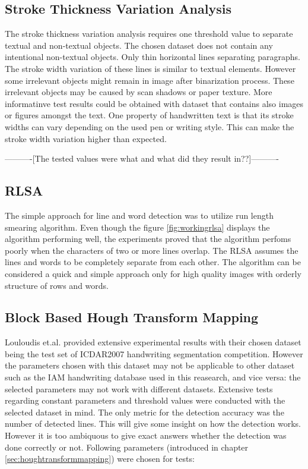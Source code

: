 \documentclass{article}
\begin{document}
    \subsection{Stroke Thickness Variation Analysis}
      The stroke thickness variation analysis requires one threshold value to separate textual and non-textual objects. The chosen dataset does not contain any intentional non-textual objects. Only thin horizontal lines separating paragraphs. The stroke width variation of these lines is similar to textual elements. However some irrelevant objects might remain in image after binarization process. These irrelevant objects may be caused by scan shadows or paper texture. More informatinve test results could be obtained with dataset that contains also images or figures amongst the text. One property of handwritten text is that its stroke widths can vary depending on the used pen or writing style. This can make the stroke width variation higher than expected.


      ----------[The tested values were what and what did they result in??]----------

    \subsection{RLSA}
      The simple approach for line and word detection was to utilize run length smearing algorithm. Even though the figure \ref{fig:workingrlsa} displays the algorithm performing well, the experiments proved that the algorithm perfoms poorly when the characters of two or more lines overlap. The RLSA assumes the lines and words to be completely separate from each other. The algorithm can be considered a quick and simple approach only for high quality images with orderly structure of rows and words.

    \subsection{Block Based Hough Transform Mapping}
      \label{sec:houghtransformevaluation}
      Louloudis et.al. provided extensive experimental results with their chosen dataset being the test set of ICDAR2007 handwriting segmentation competition. However the parameters chosen with this dataset may not be applicable to other dataset such as the IAM handwriting database used in this reasearch, and vice versa: the selected parameters may not work with different datasets. Extensive tests regarding constant parameters and threshold values were conducted with the selected dataset in mind. The only metric for the detection accuracy was the number of detected lines. This will give some insight on how the detection works. However it is too ambiquous to give exact answers whether the detection was done correctly or not. Following parameters (introduced in chapter \ref{sec:houghtransformmapping}) were chosen for tests:
\end{document}
